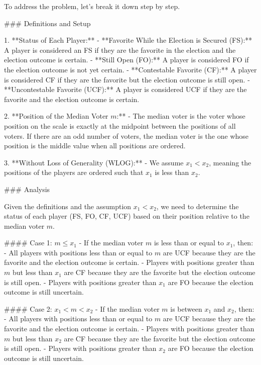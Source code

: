 To address the problem, let's break it down step by step.

### Definitions and Setup

1. **Status of Each Player:**
   - **Favorite While the Election is Secured (FS):** A player is considered an FS if they are the favorite in the election and the election outcome is certain.
   - **Still Open (FO):** A player is considered FO if the election outcome is not yet certain.
   - **Contestable Favorite (CF):** A player is considered CF if they are the favorite but the election outcome is still open.
   - **Uncontestable Favorite (UCF):** A player is considered UCF if they are the favorite and the election outcome is certain.

2. **Position of the Median Voter \( m \):**
   - The median voter is the voter whose position on the scale is exactly at the midpoint between the positions of all voters. If there are an odd number of voters, the median voter is the one whose position is the middle value when all positions are ordered.

3. **Without Loss of Generality (WLOG):**
   - We assume \( x_1 < x_2 \), meaning the positions of the players are ordered such that \( x_1 \) is less than \( x_2 \).

### Analysis

Given the definitions and the assumption \( x_1 < x_2 \), we need to determine the status of each player (FS, FO, CF, UCF) based on their position relative to the median voter \( m \).

#### Case 1: \( m \leq x_1 \)
- If the median voter \( m \) is less than or equal to \( x_1 \), then:
  - All players with positions less than or equal to \( m \) are UCF because they are the favorite and the election outcome is certain.
  - Players with positions greater than \( m \) but less than \( x_1 \) are CF because they are the favorite but the election outcome is still open.
  - Players with positions greater than \( x_1 \) are FO because the election outcome is still uncertain.

#### Case 2: \( x_1 < m < x_2 \)
- If the median voter \( m \) is between \( x_1 \) and \( x_2 \), then:
  - All players with positions less than or equal to \( m \) are UCF because they are the favorite and the election outcome is certain.
  - Players with positions greater than \( m \) but less than \( x_2 \) are CF because they are the favorite but the election outcome is still open.
  - Players with positions greater than \( x_2 \) are FO because the election outcome is still uncertain.

